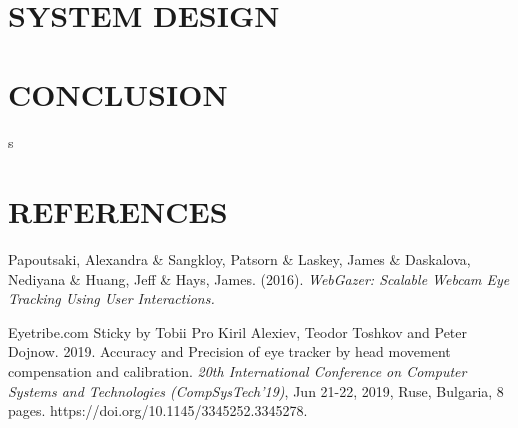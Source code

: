 \documentclass[a4paper,12pt,oneside]{article}
\begin{document}
\newpage
\section{SYSTEM DESIGN}




\newpage
\section{CONCLUSION}
\paragraph{}


\newpage

s\section{REFERENCES}
\begin{thebibliography}{9}
    Papoutsaki, Alexandra \& Sangkloy, Patsorn \& Laskey, James \& Daskalova, Nediyana \& Huang, Jeff \& Hays, James. (2016). \emph{WebGazer: Scalable Webcam Eye Tracking Using User Interactions.}

    Eyetribe.com
    Sticky by Tobii Pro
    Kiril Alexiev, Teodor Toshkov and Peter Dojnow. 2019. Accuracy and Precision of eye tracker by head movement compensation and calibration. \emph{20th International Conference on Computer Systems and Technologies
(CompSysTech'19)}, Jun 21-22, 2019, Ruse, Bulgaria, 8 pages.
https://doi.org/10.1145/3345252.3345278.



\end{thebibliography}
\end{document}
